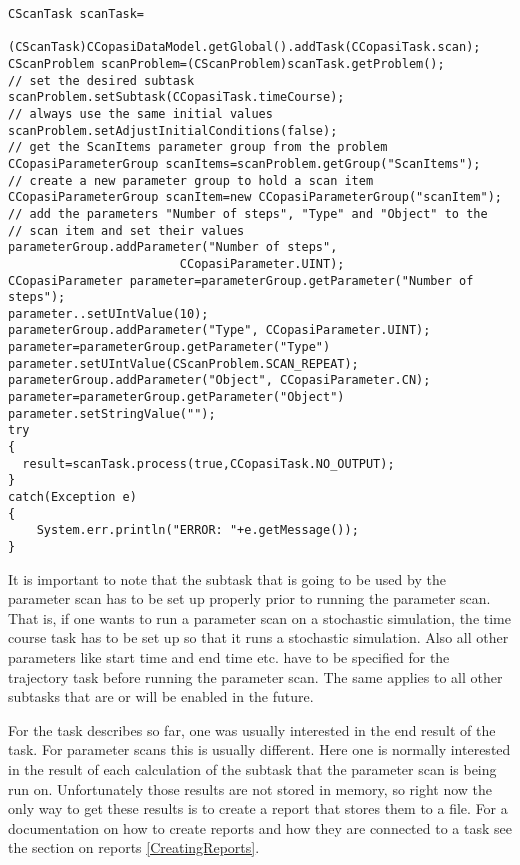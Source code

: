 \documentclass[a4,10pt]{article}
\begin{document}
\begin{lstlisting}
CScanTask scanTask=
      (CScanTask)CCopasiDataModel.getGlobal().addTask(CCopasiTask.scan);
CScanProblem scanProblem=(CScanProblem)scanTask.getProblem();
// set the desired subtask
scanProblem.setSubtask(CCopasiTask.timeCourse);
// always use the same initial values
scanProblem.setAdjustInitialConditions(false);
// get the ScanItems parameter group from the problem
CCopasiParameterGroup scanItems=scanProblem.getGroup("ScanItems");
// create a new parameter group to hold a scan item
CCopasiParameterGroup scanItem=new CCopasiParameterGroup("scanItem");
// add the parameters "Number of steps", "Type" and "Object" to the 
// scan item and set their values
parameterGroup.addParameter("Number of steps",
                        CCopasiParameter.UINT);
CCopasiParameter parameter=parameterGroup.getParameter("Number of steps");
parameter..setUIntValue(10);
parameterGroup.addParameter("Type", CCopasiParameter.UINT);
parameter=parameterGroup.getParameter("Type")
parameter.setUIntValue(CScanProblem.SCAN_REPEAT);
parameterGroup.addParameter("Object", CCopasiParameter.CN);
parameter=parameterGroup.getParameter("Object")
parameter.setStringValue("");
try
{
  result=scanTask.process(true,CCopasiTask.NO_OUTPUT);
}
catch(Exception e)
{
    System.err.println("ERROR: "+e.getMessage());
}

\end{lstlisting}

It is important to note that the subtask that is going to be used by the parameter scan has to be set up properly prior to running the parameter scan. That is, if one wants to run a parameter scan on a stochastic simulation, the time course task has to be set up so that it runs a stochastic simulation. Also all other parameters like start time and end time etc. have to be specified for the trajectory task before running the parameter scan.
The same applies to all other subtasks that are or will be enabled in the future.


For the task describes so far, one was usually interested in the end result of the task. For parameter scans this is usually different. Here one is normally interested in the result of each calculation of the subtask that the parameter scan is being run on.
Unfortunately those results are not stored in memory, so right now the only way to get these results is to create a report that stores them to a file. For a documentation on how to create reports and how they are connected to a task see the section on reports \ref{CreatingReports}.
\end{document}
